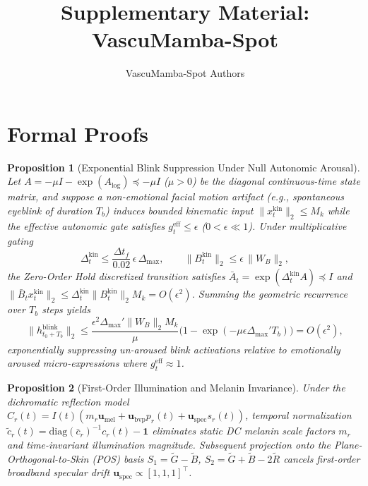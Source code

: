 \documentclass[10pt,twocolumn,letterpaper]{article}
\title{\textbf{Supplementary Material: VascuMamba-Spot}}
\author{VascuMamba-Spot Authors}
\date{}
\newtheorem{proposition}{Proposition}
\begin{document}
\maketitle

\section{Formal Proofs}

\begin{proposition}[Exponential Blink Suppression Under Null Autonomic Arousal]
Let $A = -\mu I - \exp(A_{\log}) \preceq -\mu I$ ($\mu > 0$) be the diagonal continuous-time state matrix, and suppose a non-emotional facial motion artifact (e.g., spontaneous eyeblink of duration $T_b$) induces bounded kinematic input $\|x_t^{\mathrm{kin}}\|_2 \le M_k$ while the effective autonomic gate satisfies $g_t^{\mathrm{eff}} \le \epsilon$ ($0 < \epsilon \ll 1$). Under multiplicative gating
\[
\Delta_t^{\mathrm{kin}} \le \frac{\Delta t_f}{0.02}\,\epsilon\,\Delta_{\max}, \qquad \|B_t^{\mathrm{kin}}\|_2 \le \epsilon\,\|W_B\|_2,
\]
the Zero-Order Hold discretized transition satisfies $\bar{A}_t = \exp(\Delta_t^{\mathrm{kin}} A) \preceq I$ and $\|\bar{B}_t x_t^{\mathrm{kin}}\|_2 \le \Delta_t^{\mathrm{kin}} \|B_t^{\mathrm{kin}}\|_2 M_k = O(\epsilon^2)$. Summing the geometric recurrence over $T_b$ steps yields
\[
\|h_{t_0+T_b}^{\mathrm{blink}}\|_2 \le \frac{\epsilon^2 \Delta_{\max}' \|W_B\|_2 M_k}{\mu}\big(1 - \exp(-\mu \epsilon \Delta_{\max}' T_b)\big) = O(\epsilon^2),
\]
exponentially suppressing un-aroused blink activations relative to emotionally aroused micro-expressions where $g_t^{\mathrm{eff}} \approx 1$.
\end{proposition}

\begin{proposition}[First-Order Illumination and Melanin Invariance]
Under the dichromatic reflection model $C_r(t) = I(t)(m_r \mathbf{u}_{\mathrm{mel}} + \mathbf{u}_{\mathrm{bvp}} p_r(t) + \mathbf{u}_{\mathrm{spec}} s_r(t))$, temporal normalization $\tilde{c}_r(t) = \mathrm{diag}(\bar{c}_r)^{-1}c_r(t) - \mathbf{1}$ eliminates static DC melanin scale factors $m_r$ and time-invariant illumination magnitude. Subsequent projection onto the Plane-Orthogonal-to-Skin (POS) basis $S_1 = \tilde{G} - \tilde{B}$, $S_2 = \tilde{G} + \tilde{B} - 2\tilde{R}$ cancels first-order broadband specular drift $\mathbf{u}_{\mathrm{spec}} \propto [1,1,1]^\top$.
\end{proposition}
\end{document}
